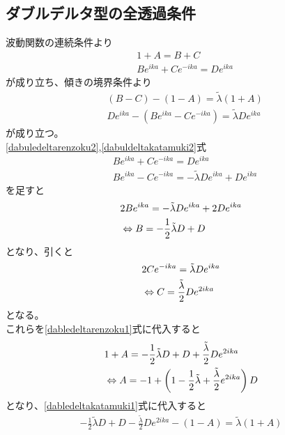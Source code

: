 \documentclass{jsarticle}  %
\numberwithin{equation}{section} %
\numberwithin{figure}{section}
\begin{document}
\subsection{ダブルデルタ型の全透過条件}
    波動関数の連続条件より
    \begin{align}
        &1 + A = B + C \label{dabledeltarenzoku1}\\
        &Be^{ika} + Ce^{-ika}= De^{ika}\label{dabuledeltarenzoku2}
    \end{align}
    が成り立ち、傾きの境界条件より
    \begin{align}
        &(B -C) - (1-A) = \tilde{\lambda}(1+A)\label{dabledeltakatamuki1}\\
        &De^{ika} - (Be^{ika}-Ce^{-ika}) = \tilde{\lambda} De^{ika} \label{dabuldeltakatamuki2}
    \end{align}
    が成り立つ。\\
    \eqref{dabuledeltarenzoku2},\eqref{dabuldeltakatamuki2}式
    \begin{align}
        &Be^{ika} + Ce^{-ika}= De^{ika}\\
        &Be^{ika}-Ce^{-ika} = -\tilde{\lambda} De^{ika} + De^{ika}
    \end{align}
    を足すと
    \begin{align}
        &2Be^{ika} = -\tilde{\lambda} De^{ika} + 2De^{ika} \notag \\
        &\Leftrightarrow B = -\frac{1}{2}\tilde{\lambda}D  + D 
    \end{align}
    となり、引くと
    \begin{align}
        &2Ce^{-ika} = \tilde{\lambda}De^{ika} \notag \\
        &\Leftrightarrow C = \frac{\tilde{\lambda}}{2}De^{2ika}
    \end{align}
    となる。\\
    これらを\eqref{dabledeltarenzoku1}式に代入すると
    \begin{align}
        &1+A=-\frac{1}{2}\tilde{\lambda}D  + D+ \frac{\tilde{\lambda}}{2}De^{2ika} \notag \\
        &\Leftrightarrow A = -1 + \left( 1-\frac{1}{2}\tilde{\lambda}  +  \frac{\tilde{\lambda}}{2}e^{2ika} \right)D\label{dabledeltaA}
    \end{align}
    となり、\eqref{dabledeltakatamuki1}式に代入すると
    \begin{align}
        -\frac{1}{2}\tilde{\lambda}D  + D  -\frac{\tilde{\lambda}}{2}De^{2ika} - (1-A) = \tilde{\lambda}(1+A)
    \end{align}
\end{document}

